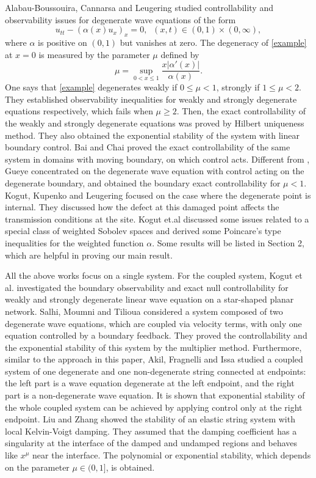\documentclass[twoside]{article}
\theoremstyle{noparens}
\theoremstyle{definition}
\numberwithin{equation}{section}
\numberwithin{figure}{section}
\begin{document}
Alabau-Boussouira, Cannarsa and Leugering \cite{Alabau} studied controllability and observability issues for degenerate wave equations of the form
\begin{equation}\label{example}
	u_{tt}-(\alpha(x)u_x)_x = 0,\;\;(x,t)\in(0,1)\times(0,\infty),
\end{equation}
where $\alpha$ is positive on $(0,1)$ but vanishes at zero. The degeneracy of \eqref{example} at $x=0$ is measured by the parameter $\mu$ defined by
\begin{equation*}
	\mu = \sup_{0< x \leq 1}\frac{x|\alpha'(x)|}{\alpha(x)}.
\end{equation*}
One says that \eqref{example} degenerates weakly if $0\leq\mu<1$, strongly if $1\leq \mu<2$. They established observability inequalities for weakly and strongly degenerate equations respectively, which fails when $\mu \geq 2$. Then, the exact controllability of the weakly and strongly degenerate equations was proved by Hilbert uniqueness method. They also obtained the exponential stability of the system with linear boundary control. Bai and Chai \cite{Chai} proved the exact controllability of  the same system in domains with moving boundary, on which control acts.
Different from \cite{Alabau}, Gueye \cite{Gueye} concentrated on the degenerate wave equation with control acting on the degenerate boundary, and obtained the boundary exact controllability for $\mu<1$. Kogut, Kupenko and Leugering \cite{Kogut} focused on the case where the degenerate point is internal. They discussed how the defect at this damaged point affects the transmission conditions at the site.
Kogut et.al \cite{Wang} discussed some issues related to a special class of weighted Sobolev spaces and derived some Poincare's type inequalities for the weighted function $\alpha$. Some results will be listed in Section 2, which are helpful in proving our main result.

All the above works focus on a single system. For the coupled system, Kogut et al. \cite{network,network1} investigated the boundary observability and exact null controllability for weakly and strongly degenerate linear wave equation on a star-shaped planar network.
Salhi, Moumni and Tilioua \cite{couple,couple1} considered a system composed of two degenerate wave equations, which are coupled via velocity terms, with only one equation controlled by a boundary feedback. They proved the controllability and the exponential stability of this system by the multiplier method.
Furthermore, similar to the approach in this paper, Akil, Fragnelli and Issa \cite{two-strings} studied a coupled system of one degenerate and one non-degenerate string connected at endpoints: the left part is a wave equation degenerate at the left endpoint, and the right part is a non-degenerate wave equation. It is shown that exponential stability of the whole coupled system can be
achieved by applying control only at the right endpoint. Liu and Zhang \cite{LZ} showed the stability of an elastic string system with local Kelvin-Voigt damping. They assumed that the damping coefficient has a singularity at the interface
of the damped and undamped regions and behaves like $x^{\mu}$ near the interface. The polynomial or exponential stability, which depends on the parameter $\mu\in (0, 1]$, is obtained.
\end{document}
